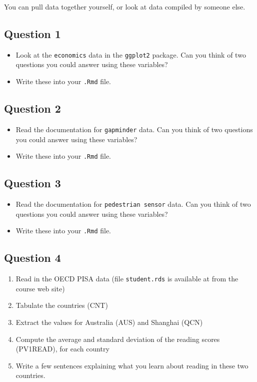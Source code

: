 \documentclass[]{article}
\providecommand{\tightlist}{%
  \setlength{\itemsep}{0pt}\setlength{\parskip}{0pt}}
\begin{document}
You can pull data together yourself, or look at data compiled by someone
else.

\hypertarget{question-1}{%
\subsection{Question 1}\label{question-1}}

\begin{itemize}
\item
  Look at the \texttt{economics} data in the \texttt{ggplot2} package.
  Can you think of two questions you could answer using these variables?
\item
  Write these into your \texttt{.Rmd} file.
\end{itemize}

\hypertarget{question-2}{%
\subsection{Question 2}\label{question-2}}

\begin{itemize}
\item
  Read the documentation for \texttt{gapminder} data. Can you think of
  two questions you could answer using these variables?
\item
  Write these into your \texttt{.Rmd} file.
\end{itemize}

\hypertarget{question-3}{%
\subsection{Question 3}\label{question-3}}

\begin{itemize}
\item
  Read the documentation for \texttt{pedestrian\ sensor} data. Can you
  think of two questions you could answer using these variables?
\item
  Write these into your \texttt{.Rmd} file.
\end{itemize}

\hypertarget{question-4}{%
\subsection{Question 4}\label{question-4}}

\begin{enumerate}
\def\labelenumi{\arabic{enumi}.}
\tightlist
\item
  Read in the OECD PISA data (file \texttt{student.rds} is available at
  from the course web site)
\item
  Tabulate the countries (CNT)
\item
  Extract the values for Australia (AUS) and Shanghai (QCN)
\item
  Compute the average and standard deviation of the reading scores
  (PV1READ), for each country
\item
  Write a few sentences explaining what you learn about reading in these
  two countries.
\end{enumerate}
\end{document}
